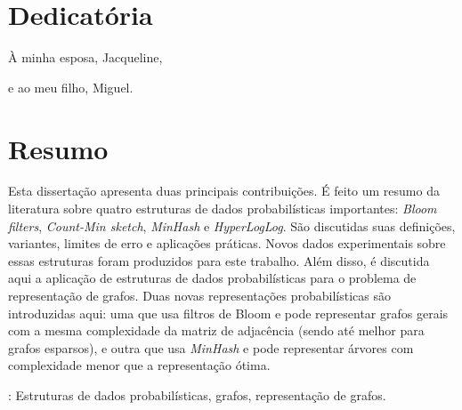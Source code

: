 \documentclass[titlepage,a4paper,oneside,onecolumn,12pt]{report}
\begin{document}
\capa
\folhaderosto

%

\begin{folhadeaprovacao}
\end{folhadeaprovacao}

\chapter*{Dedicatória}
  \vfill\vfill
    \hfill À minha esposa, Jacqueline,
    
    \hfill e ao meu filho, Miguel.
  \vfill



\chapter*{Resumo}


Esta dissertação apresenta duas principais contribuições. É feito um resumo da literatura sobre quatro estruturas de dados probabilísticas importantes: \emph{Bloom filters}, \emph{Count-Min sketch}, \emph{MinHash} e \emph{HyperLogLog}. São discutidas suas definições, variantes, limites de erro e aplicações práticas. Novos dados experimentais sobre essas estruturas foram produzidos para este trabalho. Além disso, é discutida aqui a aplicação de estruturas de dados probabilísticas para o problema de representação de grafos. Duas novas representações probabilísticas são introduzidas aqui: uma que usa filtros de Bloom e pode representar grafos gerais com a mesma complexidade da matriz de adjacência (sendo até melhor para grafos esparsos), e outra que usa \emph{MinHash} e pode representar árvores com complexidade menor que a representação ótima.

\vspace{1em}
: Estruturas de dados probabilísticas, grafos, representação de grafos.
\end{document}
